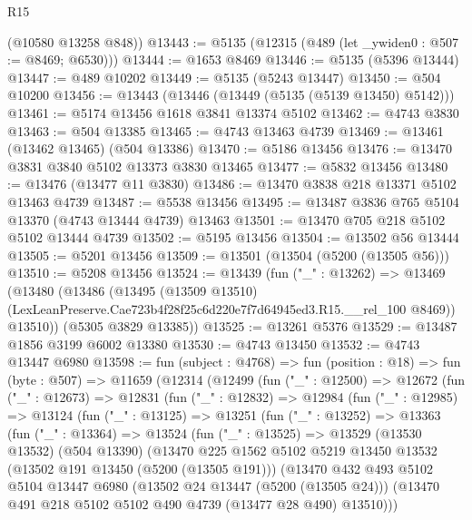 \begin{lexlean}{R15}
\begin{coremodule}
{{{{{{{{{{{      (@10580 @13258 @848))
@13443 := @5135 (@12315 (@489 (let _ywiden0 : @507 := @8469; @6530)))
@13444 := @1653 @8469
@13446 := @5135 (@5396 @13444)
@13447 := @489 @10202
@13449 := @5135 (@5243 @13447)
@13450 := @504 @10200
@13456 := @13443 (@13446 (@13449 (@5135 (@5139 @13450) @5142)))
@13461 := @5174 @13456 @1618 @3841 @13374 @5102
@13462 := @4743 @3830
@13463 := @504 @13385
@13465 := @4743 @13463 @4739
@13469 := @13461 (@13462 @13465) (@504 @13386)
@13470 := @5186 @13456
@13476 := @13470 @3831 @3840 @5102 @13373 @3830 @13465
@13477 := @5832 @13456
@13480 := @13476 (@13477 @11 @3830)
@13486 := @13470 @3838 @218 @13371 @5102 @13463 @4739
@13487 := @5538 @13456
@13495 := @13487 @3836 @765 @5104 @13370 (@4743 @13444 @4739) @13463
@13501 := @13470 @705 @218 @5102 @5102 @13444 @4739
@13502 := @5195 @13456
@13504 := @13502 @56 @13444
@13505 := @5201 @13456
@13509 := @13501 (@13504 (@5200 (@13505 @56)))
@13510 := @5208 @13456
@13524 := @13439
    (fun ("_" : @13262) =>
    @13469
      (@13480
        (@13486
          (@13495
            (@13509 @13510)
            (LexLeanPreserve.Cae723b4f28f25c6d220e7f7d64945ed3.R15.__rel_100 @8469))
          @13510))
      (@5305 @3829 @13385))
@13525 := @13261 @5376
@13529 := @13487 @1856 @3199 @6002 @13380
@13530 := @4743 @13450
@13532 := @4743 @13447 @6980
@13598 := fun (subject : @4768) =>
  fun (position : @18) =>
  fun (byte : @507) =>
  @11659
    (@12314
      (@12499
        (fun ("_" : @12500) =>
        @12672
          (fun ("_" : @12673) =>
          @12831
            (fun ("_" : @12832) =>
            @12984
              (fun ("_" : @12985) =>
              @13124
                (fun ("_" : @13125) =>
                @13251
                  (fun ("_" : @13252) =>
                  @13363
                    (fun ("_" : @13364) =>
                    @13524
                      (fun ("_" : @13525) =>
                      @13529
                        (@13530 @13532)
                        (@504 @13390)
                        (@13470
                          @225
                          @1562
                          @5102
                          @5219
                          @13450
                          @13532
                          (@13502 @191 @13450 (@5200 (@13505 @191)))
                          (@13470
                            @432
                            @493
                            @5102
                            @5104
                            @13447
                            @6980
                            (@13502 @24 @13447 (@5200 (@13505 @24)))
                            (@13470 @491 @218 @5102 @5102 @490 @4739 (@13477 @28 @490) @13510)))
}}}}}}}}}}}
\end{coremodule}
\end{lexlean}
